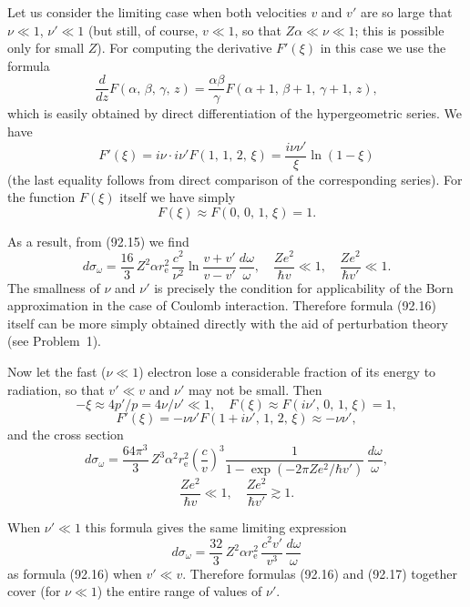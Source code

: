 Let us consider the limiting case when both velocities $v$ and $v'$ are so large that $\nu \ll 1$, $\nu' \ll 1$ (but still, of course, $v \ll 1$, so that $Z\alpha \ll \nu \ll 1$; this is possible only for small $Z$). For computing the derivative $F'(\xi)$ in this case we use the formula
\[
\frac{d}{dz}F(\alpha,\,\beta,\,\gamma,\,z) = \frac{\alpha\beta}{\gamma}F(\alpha+1,\,\beta+1,\,\gamma+1,\,z),
\]
which is easily obtained by direct differentiation of the hypergeometric series. We have
\[
F'(\xi) = i\nu\cdot i\nu' F(1,\,1,\,2,\,\xi) = \frac{i\nu\nu'}{\xi}\ln(1-\xi)
\]
(the last equality follows from direct comparison of the corresponding series). For the function $F(\xi)$ itself we have simply
\[
F(\xi) \approx F(0,\,0,\,1,\,\xi) = 1.
\]

As a result, from (92.15) we find
\begin{equation}
d\sigma_\omega = \frac{16}{3}\,Z^2\alpha r_\mathrm{e}^2\,\frac{c^2}{\nu^2}\ln\frac{v+v'}{v-v'}\,\frac{d\omega}{\omega}, \quad \frac{Ze^2}{\hbar v} \ll 1, \quad \frac{Ze^2}{\hbar v'} \ll 1.
\label{eq:92.16}
\end{equation}
The smallness of $\nu$ and $\nu'$ is precisely the condition for applicability of the Born approximation in the case of Coulomb interaction. Therefore formula (92.16) itself can be more simply obtained directly with the aid of perturbation theory (see Problem~1).

Now let the fast ($\nu \ll 1$) electron lose a considerable fraction of its energy to radiation, so that $v' \ll v$ and $\nu'$ may not be small. Then
\[
-\xi \approx 4p'/p = 4\nu/\nu' \ll 1, \quad F(\xi) \approx F(i\nu',\,0,\,1,\,\xi) = 1,
\]
\[
F'(\xi) = -\nu\nu'F(1+i\nu',\,1,\,2,\,\xi) \approx -\nu\nu',
\]
and the cross section
\begin{equation}
d\sigma_\omega = \frac{64\pi^3}{3}\,Z^3\alpha^2 r_\mathrm{e}^2\left(\frac{c}{v}\right)^{\!3}\frac{1}{1-\exp(-2\pi Ze^2/\hbar v')}\,\frac{d\omega}{\omega},
\label{eq:92.17}
\end{equation}
\[
\frac{Ze^2}{\hbar v} \ll 1, \quad \frac{Ze^2}{\hbar v'} \gtrsim 1.
\]

When $\nu' \ll 1$ this formula gives the same limiting expression
\begin{equation}
d\sigma_\omega = \frac{32}{3}\,Z^2\alpha r_\mathrm{e}^2\,\frac{c^2 v'}{v^3}\,\frac{d\omega}{\omega}
\end{equation}
as formula (92.16) when $v' \ll v$. Therefore formulas (92.16) and (92.17) together cover (for $\nu \ll 1$) the entire range of values of $\nu'$.

